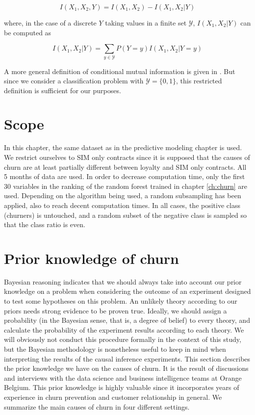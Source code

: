 \begin{equation}
    \label{eq:int_cond}
    I(X_1, X_2, Y) = I(X_1, X_2) - I(X_1, X_2 | Y)
\end{equation}

where, in the case of a discrete $Y$ taking values in a finite set $\mathcal
Y$, $I(X_1, X_2 | Y)$ can be computed as

\begin{equation}
    \label{eq:int_cond_sum}
    I(X_1, X_2 | Y) = \sum_{y\in\mathcal Y}P(Y=y)I(X_1, X_2 | Y = y)
\end{equation}

A more general definition of conditional mutual information is given in
\parencite{cover2012elements}. But since we consider a classification problem
with $\mathcal Y = \{0, 1\}$, this restricted definition is sufficient for our
purposes.

\section{Scope}

In this chapter, the same dataset as in the predictive modeling chapter is used.
We restrict ourselves to SIM only contracts since it is supposed that the causes
of churn are at least partially different between loyalty and SIM only
contracts. All 5 months of data are used. In order to decrease computation time,
only the first 30 variables in the ranking of the random forest trained in
chapter \ref{ch:churn} are used. Depending on the algorithm being used, a random
subsampling has been applied, also to reach decent computation times. In all
cases, the positive class (churners) is untouched, and a random subset of the
negative class is sampled so that the class ratio is even.

\section{Prior knowledge of churn}
\label{sec:causal_prior}

Bayesian reasoning indicates that we should always take into account our prior
knowledge on a problem when considering the outcome of an experiment designed to
test some hypotheses on this problem. An unlikely theory according to our priors
needs strong evidence to be proven true. Ideally, we should assign a probability
(in the Bayesian sense, that is, a degree of belief) to every theory, and
calculate the probability of the experiment results according to each theory. We
will obviously not conduct this procedure formally in the context of this study,
but the Bayesian methodology is nonetheless useful to keep in mind when
interpreting the results of the causal inference experiments. This section
describes the prior knowledge we have on the causes of churn. It is the result
of discussions and interviews with the data science and business intelligence
teams at Orange Belgium. This prior knowledge is highly valuable since it
incorporates years of experience in churn prevention and customer relationship
in general. We summarize the main causes of churn in four different settings.

